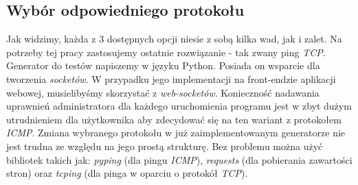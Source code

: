 \subsection{Wybór odpowiedniego protokołu}
Jak widzimy, każda z 3 dostępnych opcji niesie z sobą kilka wad, jak i zalet. Na potrzeby tej pracy zastosujemy ostatnie rozwiązanie - tak zwany ping \textit{TCP}. Generator do testów napiszemy w języku Python. Posiada on wsparcie dla tworzenia \textit{socketów}. W przypadku jego implementacji na front-endzie aplikacji webowej, musielibyśmy skorzystać z \textit{web-socketów}. Konieczność nadawania uprawnień administratora dla każdego uruchomienia programu jest w zbyt dużym utrudnieniem dla użytkownika aby zdecydować się na ten wariant z protokołem \textit{ICMP}. Zmiana wybranego protokołu w już zaimplementowanym generatorze nie jest trudna ze względu na jego prostą strukturę. Bez problemu można użyć bibliotek takich jak: \emph{pyping} (dla pingu \textit{ICMP}), \emph{requests} (dla pobierania zawartości stron) oraz \emph{tcping} (dla pinga w oparciu o protokół \textit{TCP}).
